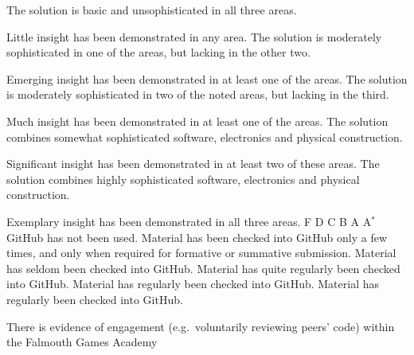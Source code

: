 \documentclass{../fal_assignment}
\begin{document}
\begin{markingrubric}
        \grade The solution is basic and unsophisticated in all three areas.
            \par Little insight has been demonstrated in any area.
        \grade The solution is moderately sophisticated in one of the areas, but lacking in the other two.
            \par Emerging insight has been demonstrated in at least one of the areas.
        \grade The solution is moderately sophisticated in two of the noted areas, but lacking in the third.
            \par Much insight has been demonstrated in at least one of the areas.
        \grade The solution combines somewhat sophisticated software, electronics and physical construction.
            \par Significant insight has been demonstrated in at least two of these areas.
        \grade The solution combines highly sophisticated software, electronics and physical construction.
            \par Exemplary insight has been demonstrated in all three areas.
        \grade\fail F
        \grade D
        \grade C
        \grade B
        \grade A
        \grade A$^*$
        \grade\fail GitHub has not been used.
        \grade Material has been checked into GitHub only a few times,
            and only when required for formative or summative submission.
        \grade Material has seldom been checked into GitHub.
        \grade Material has quite regularly been checked into GitHub.
        \grade Material has regularly been checked into GitHub.
        \grade Material has regularly been checked into GitHub.
            \par There is evidence of engagement (e.g.\ voluntarily reviewing peers' code)
                within the Falmouth Games Academy
\end{markingrubric}
\end{document}
